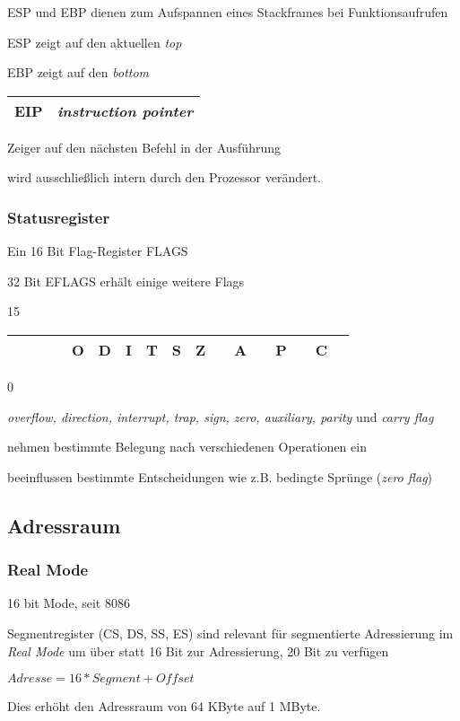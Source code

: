 ESP und EBP dienen zum Aufspannen eines Stackframes bei Funktionsaufrufen

ESP zeigt auf den aktuellen \emph{top}

EBP zeigt auf den \emph{bottom}

\begin{tabular}{|c|l|}
\hline EIP & \emph{instruction pointer} \\
\hline
\end{tabular}

Zeiger auf den nächsten Befehl in der Ausführung

wird ausschließlich intern durch den Prozessor verändert.

\subsubsection{Statusregister}

Ein 16 Bit Flag-Register FLAGS

32 Bit EFLAGS erhält einige weitere Flags

{\small 15}
\begin{tabular}{|c|c|c|c|c|c|c|c|c|c|c|c|c|c|c|c|c|}
\hline & & & & O & D & I & T & S & Z & & A & & P & & C \\
\hline
\end{tabular}
{\small 0}

\emph{overflow, direction, interrupt, trap, sign, zero, auxiliary, parity}
und \emph{carry flag} 

nehmen bestimmte Belegung nach verschiedenen Operationen ein

beeinflussen bestimmte Entscheidungen wie z.B. bedingte Sprünge (\emph{zero flag})


\subsection{Adressraum}

\subsubsection{Real Mode}

16 bit Mode, seit 8086

Segmentregister (CS, DS, SS, ES) sind relevant für segmentierte Adressierung im
\emph{Real Mode} um über statt 16 Bit zur Adressierung, 20 Bit zu verfügen

$Adresse = 16 * Segment + Offset$

Dies erhöht den Adressraum von 64 KByte auf 1 MByte.


